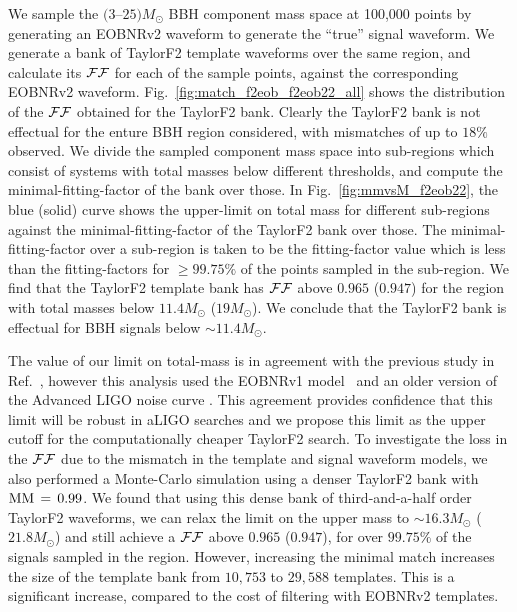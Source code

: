 We sample the $(3$--$25) M_\odot$ BBH component mass space at 100,000 points by
generating an EOBNRv2 waveform to generate the ``true'' signal waveform.  We
generate a bank of TaylorF2 template waveforms over the same region, and
calculate its $\mathcal{FF}$ for each of the sample points, against the corresponding
EOBNRv2 waveform. Fig.~\ref{fig:match_f2eob_f2eob22_all}  shows the
distribution of the $\mathcal{FF}$ obtained for the TaylorF2 bank. Clearly the TaylorF2
bank is not effectual for the enture BBH region considered, with mismatches of
up to $18\%$ observed. We divide the sampled component mass space into
sub-regions which consist of systems with total masses below different thresholds,
and compute the minimal-fitting-factor of the bank over those. In Fig.~\ref{fig:mmvsM_f2eob22}, 
the blue (solid) curve shows the upper-limit on 
total mass for different sub-regions against the minimal-fitting-factor of the 
TaylorF2 bank over those. The minimal-fitting-factor over a sub-region is 
taken to be the fitting-factor value which is less than the fitting-factors
for $\geq 99.75\%$ of the points sampled in the sub-region. We find that the 
TaylorF2 template bank has $\mathcal{FF}$ above $0.965$ ($0.947$) for the region 
with total masses below $11.4M_{\odot}$ ($19M_{\odot}$). We conclude 
that the TaylorF2 bank is effectual for BBH signals below $\sim 11.4M_{\odot}$. 

The value of our limit on total-mass is in agreement with the previous study in
Ref.~\cite{CompTemplates2009}, however this analysis used the EOBNRv1
model~\cite{Buonanno:2007pf} and an older version of the Advanced LIGO noise
curve \cite{CompTemplates2009}. This agreement provides
confidence that this limit will be robust in aLIGO searches and we propose
this limit as the upper cutoff for the computationally cheaper TaylorF2
search. To investigate the loss in the $\mathcal{FF}$ due to the mismatch in the
template and signal waveform models, we also performed a Monte-Carlo
simulation using a denser TaylorF2 bank with $\mathrm{MM}\,=\,0.99$. We found that
using this dense bank of third-and-a-half order TaylorF2 waveforms, we can
relax the limit on the upper mass to $\sim 16.3M_{\odot}$ ($21.8M_{\odot}$) and
still achieve a  $\mathcal{FF}$ above $0.965$ ($0.947$), for over $99.75\%$ of the signals
sampled in the region.  However, 
increasing the minimal match increases the size of the template bank from 
$10,753$ to $29,588$ templates. This is a significant increase, compared to 
the cost of filtering with EOBNRv2 templates.

